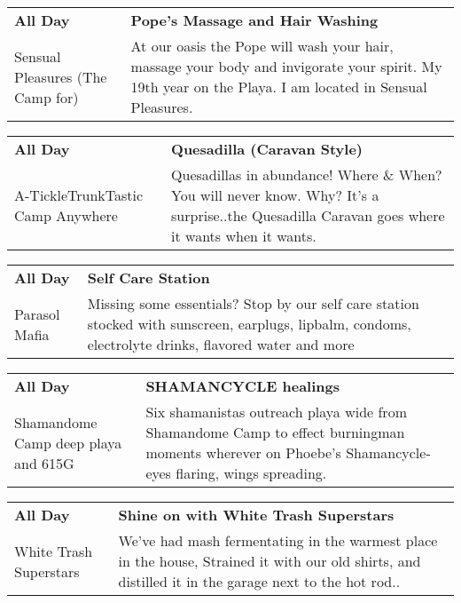 \begin{tabular}{ p{1in} p{2.2in} }
    \textbf{All Day} & \textbf{Pope's Massage and Hair Washing} \\
    Sensual Pleasures (The Camp for) \newline  & At our oasis the Pope will wash your hair, massage your body and invigorate your spirit. My 19th year on the Playa. I am located in Sensual Pleasures. \\
    \hline 
\end{tabular}
    
\begin{tabular}{ p{1in} p{2.2in} }
    \textbf{All Day} & \textbf{Quesadilla (Caravan Style)} \\
    A-TickleTrunkTastic Camp \newline Anywhere & Quesadillas in abundance! Where \& When? You will never know. Why? It's a surprise..the Quesadilla Caravan goes where it wants when it wants. \\
    \hline 
\end{tabular}
    
\begin{tabular}{ p{1in} p{2.2in} }
    \textbf{All Day} & \textbf{Self Care Station} \\
    Parasol Mafia \newline  & Missing some essentials? Stop by our self care station stocked with sunscreen, earplugs, lipbalm, condoms, electrolyte drinks, flavored water and more \\
    \hline 
\end{tabular}
    
\begin{tabular}{ p{1in} p{2.2in} }
    \textbf{All Day} & \textbf{SHAMANCYCLE healings} \\
    Shamandome Camp \newline deep playa and 615G & Six shamanistas outreach playa wide from Shamandome Camp to effect burningman moments wherever on Phoebe's Shamancycle- eyes flaring, wings spreading. \\
    \hline 
\end{tabular}
    
\begin{tabular}{ p{1in} p{2.2in} }
    \textbf{All Day} & \textbf{Shine on with White Trash Superstars} \\
    White Trash Superstars \newline  & We've had mash fermentating in the warmest place in the house, Strained it with our old shirts, and distilled it in the garage next to the hot rod.. \\
    \hline 
\end{tabular}
    
